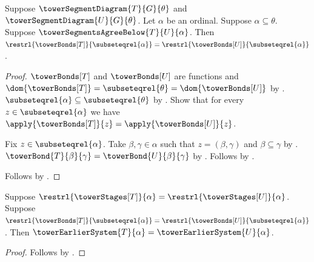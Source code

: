 \begin{proposition}\label{tower_agreement_bond_restrictions}
    Suppose $\towerSegmentDiagram{T}{G}{\theta}$ and
        $\towerSegmentDiagram{U}{G}{\theta}$.
    Let $\alpha$ be an ordinal.
    Suppose $\alpha\subseteq\theta$.
    Suppose $\towerSegmentsAgreeBelow{T}{U}{\alpha}$.
    Then $\restrl{\towerBonds[T]}{\subseteqrel{\alpha}}=
        \restrl{\towerBonds[U]}{\subseteqrel{\alpha}}$.
\end{proposition}
\begin{proof}
    $\towerBonds[T]$ and $\towerBonds[U]$ are functions and
        $\dom{\towerBonds[T]}=\subseteqrel{\theta}=
            \dom{\towerBonds[U]}$ by
        .
    $\subseteqrel{\alpha}\subseteq\subseteqrel{\theta}$ by
        .
    Show that for every $z\in\subseteqrel{\alpha}$ we have
        $\apply{\towerBonds[T]}{z}=\apply{\towerBonds[U]}{z}$.
    \begin{subproof}
        Fix $z\in\subseteqrel{\alpha}$.
        Take $\beta,\gamma\in\alpha$ such that
            $z=(\beta,\gamma)$ and $\beta\subseteq\gamma$ by
            .
        $\towerBond{T}{\beta}{\gamma}=
            \towerBond{U}{\beta}{\gamma}$ by
            .
        Follows by .
    \end{subproof}
    Follows by .
\end{proof}

\begin{proposition}\label{tower_earlier_system_congruence}
    Suppose $\restrl{\towerStages[T]}{\alpha}=
        \restrl{\towerStages[U]}{\alpha}$.
    Suppose $\restrl{\towerBonds[T]}{\subseteqrel{\alpha}}=
        \restrl{\towerBonds[U]}{\subseteqrel{\alpha}}$.
    Then $\towerEarlierSystem{T}{\alpha}=
        \towerEarlierSystem{U}{\alpha}$.
\end{proposition}
\begin{proof}
    Follows by
        .
\end{proof}

